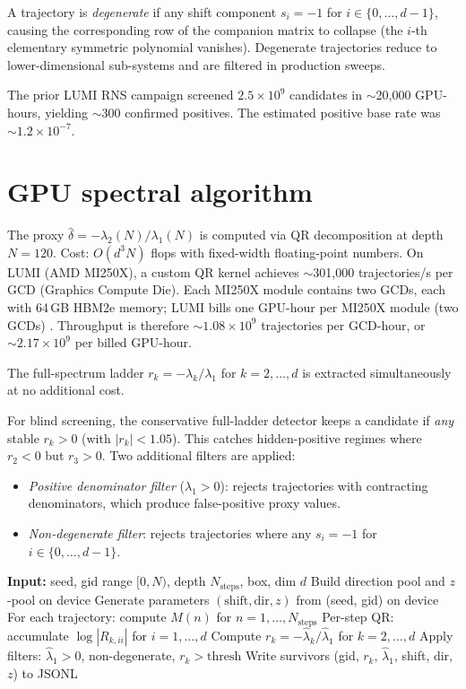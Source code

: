 \documentclass[11pt]{article}
\begin{document}
A trajectory is \emph{degenerate} if any shift component $s_i = -1$ for $i \in \{0, \ldots, d-1\}$, causing the corresponding row of the companion matrix to collapse (the $i$-th elementary symmetric polynomial vanishes). Degenerate trajectories reduce to lower-dimensional sub-systems and are filtered in production sweeps.

The prior LUMI RNS campaign screened $2.5 \times 10^9$ candidates in $\sim$20{,}000 GPU-hours, yielding $\sim$300 confirmed positives. The estimated positive base rate was $\sim 1.2 \times 10^{-7}$.

\section{GPU spectral algorithm}

The proxy $\hat\delta = -\lambda_2(N)/\lambda_1(N)$ is computed via QR decomposition at depth $N=120$. Cost: $O(d^3 N)$ flops with fixed-width floating-point numbers. On LUMI (AMD MI250X), a custom QR kernel achieves $\sim$301{,}000 trajectories/s per GCD (Graphics Compute Die). Each MI250X module contains two GCDs, each with 64\,GB HBM2e memory; LUMI bills one GPU-hour per MI250X module (two GCDs) \cite{lumi_hardware,lumi_billing}. Throughput is therefore $\sim 1.08 \times 10^9$ trajectories per GCD-hour, or $\sim 2.17 \times 10^9$ per billed GPU-hour.

The full-spectrum ladder $r_k = -\lambda_k/\lambda_1$ for $k = 2, \ldots, d$ is extracted simultaneously at no additional cost.

For blind screening, the conservative full-ladder detector keeps a candidate if \emph{any} stable $r_k > 0$ (with $|r_k| < 1.05$). This catches hidden-positive regimes where $r_2 < 0$ but $r_3 > 0$. Two additional filters are applied:
\begin{itemize}
\item \emph{Positive denominator filter} ($\lambda_1 > 0$): rejects trajectories with contracting denominators, which produce false-positive proxy values.
\item \emph{Non-degenerate filter}: rejects trajectories where any $s_i = -1$ for $i \in \{0, \ldots, d-1\}$.
\end{itemize}

\begin{algorithm}
\caption{GPU proxy screening (Stage 1)}
\begin{algorithmic}[1]
\State \textbf{Input:} seed, gid range $[0, N)$, depth $N_{\text{steps}}$, box, dim $d$
\State Build direction pool and $z$-pool on device
  \State Generate parameters $(\text{shift}, \text{dir}, z)$ from (seed, gid) on device
  \State For each trajectory: compute $M(n)$ for $n = 1, \ldots, N_{\text{steps}}$
  \State Per-step QR: accumulate $\log|R_{k,ii}|$ for $i = 1, \ldots, d$
  \State Compute $r_k = -\widehat\lambda_k / \widehat\lambda_1$ for $k = 2, \ldots, d$
  \State Apply filters: $\widehat\lambda_1 > 0$, non-degenerate, $r_k > \text{thresh}$
  \State Write survivors (gid, $r_k$, $\widehat\lambda_1$, shift, dir, $z$) to JSONL
\EndFor
\end{algorithmic}
\end{algorithm}
\end{document}
